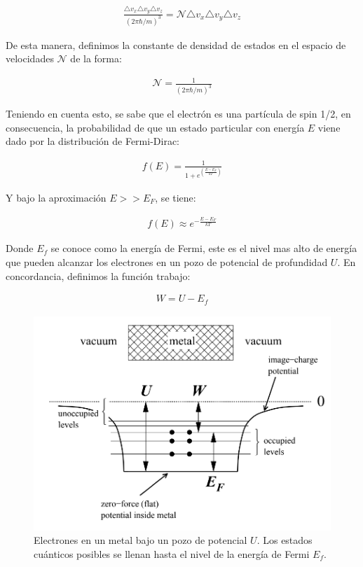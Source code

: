 \documentclass[%
 reprint,
 amsmath,amssymb,
 aps,
]{revtex4-2}
\begin{document}
\begin{align*}
    \frac{\triangle v_{x}\triangle v_{y}\triangle v_{z}}{(2\pi\hbar/m)^{3}}= \mathcal{N} \triangle v_{x}\triangle v_{y}\triangle v_{z}
\end{align*}

\vspace{0.2 cm}
De esta manera, definimos la constante de densidad de estados en el espacio de velocidades $\mathcal{N}$ de la forma:

\begin{align}
    \label{densidaddeestd}
    \mathcal{N} = \frac{1}{(2\pi\hbar/m)^{3}}
\end{align}

\vspace{0.2 cm}
Teniendo en cuenta esto, se sabe que el electrón es una partícula de spin 1/2, en consecuencia, la probabilidad de que un estado particular con energía $E$ viene dado por la distribución de Fermi-Dirac:

\begin{align*}
    f(E) = \frac{1}{1+e^{(\frac{E-E_{F}}{kT})}}
\end{align*}

\vspace{0.2 cm}
Y bajo la aproximación $E>>E_{F}$, se tiene:

\begin{align}
    f(E) \approx e^{-\frac{E-E_{F}}{kT}}
    \label{eq: Energía de Fermi}
\end{align}

\vspace{0.2 cm}
Donde $E_f$ se conoce como la energía de Fermi, este es el nivel mas alto de energía que pueden alcanzar los electrones en un pozo de potencial de profundidad $U$. En concordancia, definimos la función trabajo:

\begin{align*}
    W = U - E_f
\end{align*}

\begin{figure}[H]
    \centering
    \includegraphics[width=0.8\linewidth]{../src/imagenes/fermi.png}
    \caption{Electrones en un metal bajo un pozo de potencial $U$. Los estados cuánticos posibles se llenan hasta el nivel de la energía de Fermi $E_f$.}
    \label{fig:3}
\end{figure}
\end{document}
